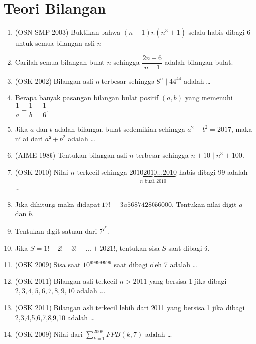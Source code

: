 \documentclass[11pt]{scrartcl}
\begin{document}
\section{Teori Bilangan}
\begin{enumerate}
    \item (OSN SMP 2003) Buktikan bahwa $(n-1)n(n^3+1)$ selalu habis dibagi 6 untuk semua bilangan asli $n$.
    
    \item Carilah semua bilangan bulat $n$ sehingga $\dfrac{2n+6}{n-1}$ adalah bilangan bulat.
    
    \item (OSK 2002) Bilangan asli $n$ terbesar sehingga $8^n \mid 44^{44}$ adalah \dots
    
    \item Berapa banyak pasangan bilangan bulat positif $(a,b)$ yang memenuhi $\dfrac{1}{a}+\dfrac{1}{b}=\dfrac{1}{6}$.
    
    \item Jika $a$ dan $b$ adalah bilangan bulat sedemikian sehingga $a^2-b^2=2017$, maka nilai dari $a^2+b^2$ adalah \dots
    
    \item (AIME 1986) Tentukan bilangan asli $n$ terbesar sehingga $n+10 \mid n^3+100$.
    
    \item (OSK 2010) Nilai $n$ terkecil sehingga $\underbrace{20102010\dots2010}_\text{$n$ buah 2010}$ habis dibagi 99 adalah \dots
    
    \item Jika dihitung maka didapat $17! = 3a56874280b6000$. Tentukan nilai digit $a$ dan $b$.
    
    \item Tentukan digit satuan dari $7^{7^7}$.
    
    \item Jika $S=1!+2!+3!+\dots+2021!$, tentukan sisa $S$ saat dibagi 6.
    
    \item (OSK 2009) Sisa saat $10^{999999999}$ saat dibagi oleh 7 adalah \dots
    \item (OSK 2011) Bilangan asli terkecil $n>2011$ yang bersisa 1 jika dibagi $2,3,4,5,6,7,8,9,10$ adalah \dots.
    
    \item (OSK 2011) Bilangan asli terkecil lebih dari 2011 yang bersisa 1 jika dibagi 2,3,4,5,6,7,8,9,10 adalah \dots
        
        \item (OSK 2009) Nilai dari $\sum_{k=1}^{2009} FPB(k,7)$ adalah \dots
        

\end{enumerate}
\end{document}
